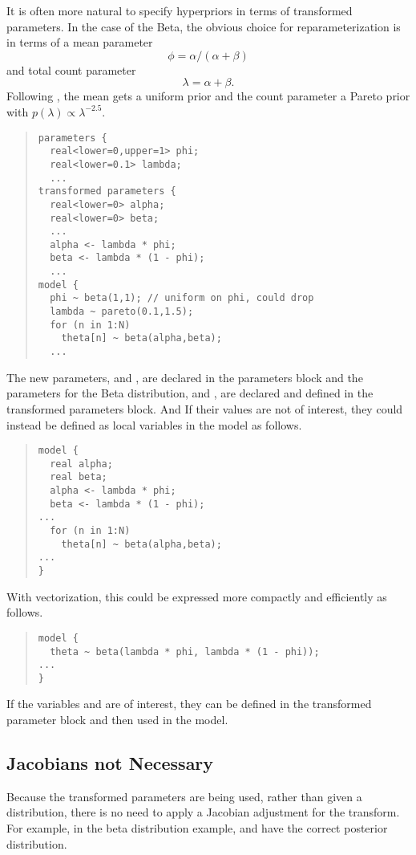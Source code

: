 It is often more natural to specify hyperpriors in terms of
transformed parameters.  In the case of the Beta, the obvious choice
for reparameterization is in terms of a mean parameter 
\[
\phi = \alpha / (\alpha + \beta)
\]
and total count parameter
\[
\lambda = \alpha + \beta.
\]
Following \citep[Chapter 5]{GelmanEtAl:2013}, the mean
gets a uniform prior and the count parameter a Pareto prior with
$p(\lambda) \propto \lambda^{-2.5}$.
%
\begin{quote}
\begin{Verbatim}[fontsize=\small]
parameters {
  real<lower=0,upper=1> phi;
  real<lower=0.1> lambda;
  ...
transformed parameters {
  real<lower=0> alpha;
  real<lower=0> beta;
  ...
  alpha <- lambda * phi;
  beta <- lambda * (1 - phi);
  ...
model {
  phi ~ beta(1,1); // uniform on phi, could drop
  lambda ~ pareto(0.1,1.5);
  for (n in 1:N)
    theta[n] ~ beta(alpha,beta);
  ...
\end{Verbatim}
\end{quote}
%
The new parameters,  and , are declared in the
parameters block and the parameters for the Beta distribution, 
 and , are declared and defined in the
transformed parameters block.  And If their values are not of interest,
they could instead be defined as local variables in the model as
follows.
%
\begin{quote}
\begin{Verbatim}[fontsize=\small]
model {
  real alpha;
  real beta;
  alpha <- lambda * phi;
  beta <- lambda * (1 - phi);
...
  for (n in 1:N)
    theta[n] ~ beta(alpha,beta);
...
}
\end{Verbatim}
\end{quote}
%
With vectorization, this could be expressed more compactly and
efficiently as follows.
\begin{quote}
\begin{Verbatim}[fontsize=\small]
model {
  theta ~ beta(lambda * phi, lambda * (1 - phi));
...
}
\end{Verbatim}
\end{quote}
%
If the variables  and  are of interest, they
can be defined in the transformed parameter block and then used in the
model.  


\subsection{Jacobians not Necessary}

Because the transformed parameters are being used, rather than given a
distribution, there is no need to apply a Jacobian adjustment for the
transform.  For example, in the beta distribution example,
 and  have the correct posterior distribution.  





